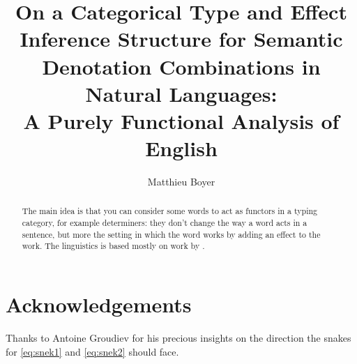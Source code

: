 \documentclass[math, english, info]{cours}
\title{On a Categorical Type and Effect Inference Structure for Semantic Denotation Combinations in Natural Languages:\\ A Purely Functional Analysis of English}
\author{Matthieu Boyer}
\begin{document}
\bettertitle

\begin{abstract}
	The main idea is that you can consider some words to act as functors in a typing category, for example determiners:
	they don't change the way a word acts in a sentence,
	but more the setting in which the word works by adding an effect to the work.
	The linguistics is based mostly on work by .
\end{abstract}











\section*{Acknowledgements}
Thanks to Antoine Groudiev for his precious insights on the direction the snakes for \eqref{eq:snek1} and \eqref{eq:snek2} should face.
\clearpage
\appendix




\end{document}

